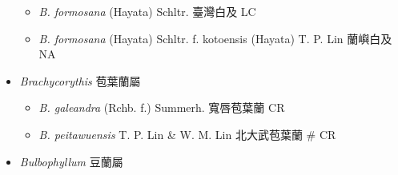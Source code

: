\begin{itemize}
  \begin{itemize}
        \item[] \textit{B. formosana} (Hayata) Schltr.  臺灣白及   LC
        \item[] \textit{B. formosana} (Hayata) Schltr. f. kotoensis (Hayata) T. P. Lin  蘭嶼白及   NA
  \end{itemize}
 \item[] \textit{Brachycorythis} 苞葉蘭屬
                                
  \begin{itemize}
        \item[] \textit{B. galeandra} (Rchb. f.) Summerh.  寬唇苞葉蘭   CR
        \item[] \textit{B. peitawuensis} T. P. Lin \& W. M. Lin  北大武苞葉蘭  \# CR
  \end{itemize}
 \item[] \textit{Bulbophyllum} 豆蘭屬
                                

\end{itemize}
